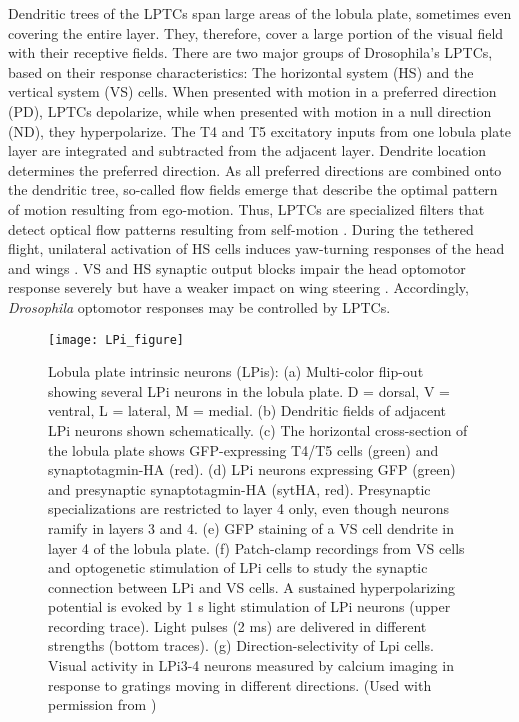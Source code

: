 Dendritic trees of the LPTCs span large areas of the lobula plate, sometimes even covering the entire layer. They, therefore, cover a large portion of the visual field with their receptive fields. There are two major groups of Drosophila's LPTCs, based on their response characteristics: The horizontal system (HS) and the vertical system (VS) cells. When presented with motion in a preferred direction (PD), LPTCs depolarize, while when presented with motion in a null direction (ND), they hyperpolarize. The T4 and T5 excitatory inputs from one lobula plate layer are integrated and subtracted from the adjacent layer. Dendrite location determines the preferred direction. As all preferred directions are combined onto the dendritic tree, so-called flow fields emerge that describe the optimal pattern of motion resulting from ego-motion. Thus, LPTCs are specialized filters that detect optical flow patterns resulting from self-motion \parencite{Krapp1996}. During the tethered flight, unilateral activation of HS cells induces yaw-turning responses of the head and wings \parencite{Haikala2013}. VS and HS synaptic output blocks impair the head optomotor response severely but have a weaker impact on wing steering \parencite{Kim2017}. Accordingly, \textit{Drosophila} optomotor responses may be controlled by LPTCs.

\begin{figure}
\centering
\hspace*{-1cm} 
\texttt{[image: LPi\_figure]}
\caption[Lobula plate intrinsic neurons (LPis)] {Lobula plate intrinsic neurons (LPis): (a) Multi-color flip-out showing several LPi neurons in the lobula plate. D = dorsal, V = ventral, L = lateral, M = medial. (b) Dendritic fields of adjacent LPi neurons shown schematically. (c) The horizontal cross-section of the lobula plate shows GFP-expressing T4/T5 cells (green) and synaptotagmin-HA (red). (d) LPi neurons expressing GFP (green) and presynaptic synaptotagmin-HA (sytHA, red). Presynaptic specializations are restricted to layer 4 only, even though neurons ramify in layers 3 and 4. (e) GFP staining of a VS cell dendrite in layer 4 of the lobula plate. (f) Patch-clamp recordings from VS cells and optogenetic stimulation of LPi cells to study the synaptic connection between LPi and VS cells. A sustained hyperpolarizing potential is evoked by 1 s light stimulation of LPi neurons (upper recording trace). Light pulses (2 ms) are delivered in different strengths (bottom traces). (g) Direction-selectivity of Lpi cells. Visual activity in LPi3-4 neurons measured by calcium imaging in response to gratings moving in different directions. (Used with permission from \parencite{Borst2020b})} 
\label{fig:lpifigure}
\end{figure}


